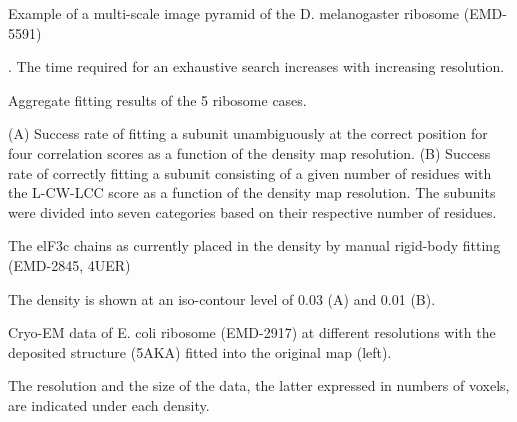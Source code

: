 \caption{Example of a multi-scale image pyramid of the D. melanogaster ribosome
(EMD-5591)}. 
{The time required for an exhaustive search increases with
increasing resolution.}
\stopbuffer

\caption{Aggregate fitting results of the 5 ribosome cases.}
{(A) Success rate of fitting a subunit unambiguously at the correct
position for four correlation scores as a function of the density map
resolution. (B) Success rate of correctly fitting a subunit consisting of a
given number of residues with the L-CW-LCC score as a function of the density
map resolution. The subunits were divided into seven categories based on their
respective number of residues.}
\stopbuffer

\caption{The elF3c chains as currently placed in the density by manual rigid-body
fitting (EMD-2845, 4UER)}
{The density is shown at an iso-contour level of 0.03 (A) and 0.01 (B).}
\stopbuffer

\caption{Cryo-EM data of E. coli ribosome (EMD-2917) at different resolutions
with the deposited structure (5AKA) fitted into the original map (left).}
{The resolution and the size of the data, the latter expressed in numbers of
voxels, are indicated under each density.}
\stopbuffer

